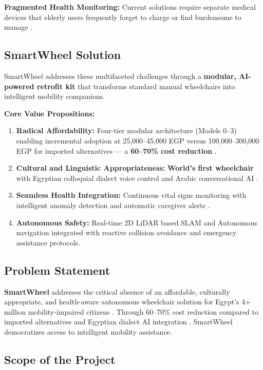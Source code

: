 \documentclass[12pt,a4paper]{report}
\begin{document}
\textbf{Fragmented Health Monitoring:} Current solutions require separate medical devices that elderly users frequently forget to charge or find burdensome to manage \cite{sonekar_2024}.

\subsection{SmartWheel Solution}

SmartWheel addresses these multifaceted challenges through a \textbf{modular, AI-powered retrofit kit} that transforms standard manual wheelchairs into intelligent mobility companions.

\textbf{Core Value Propositions:}

\begin{enumerate}[leftmargin=*,itemsep=8pt]
    \item \textbf{Radical Affordability:} Four-tier modular architecture (Models 0--3) enabling incremental adoption at 25,000--45,000 EGP versus 100,000--300,000 EGP for imported alternatives — a \textbf{60--70\% cost reduction} \cite{grandview_market}.
    \item \textbf{Cultural and Linguistic Appropriateness:} \textbf{World's first wheelchair} with Egyptian colloquial dialect voice control and Arabic conversational AI \cite{whisper,llama}.
    \item \textbf{Seamless Health Integration:} Continuous vital signs monitoring with intelligent anomaly detection and automatic caregiver alerts \cite{sonekar_2024}.
 \item \textbf{Autonomous Safety:} Real-time 2D LiDAR based SLAM and Autonomous navigation integrated with reactive collision avoidance and emergency assistance protocols.
\end{enumerate}

\subsection{Problem Statement}

\textbf{SmartWheel} addresses the critical absence of an affordable, culturally appropriate, and health-aware autonomous wheelchair solution for Egypt's 4+ million mobility-impaired citizens \cite{idsc_egypt}. Through 60--70\% cost reduction compared to imported alternatives \cite{grandview_market} and Egyptian dialect AI integration , SmartWheel democratizes access to intelligent mobility assistance.

\subsection{Scope of the Project}
\end{document}
